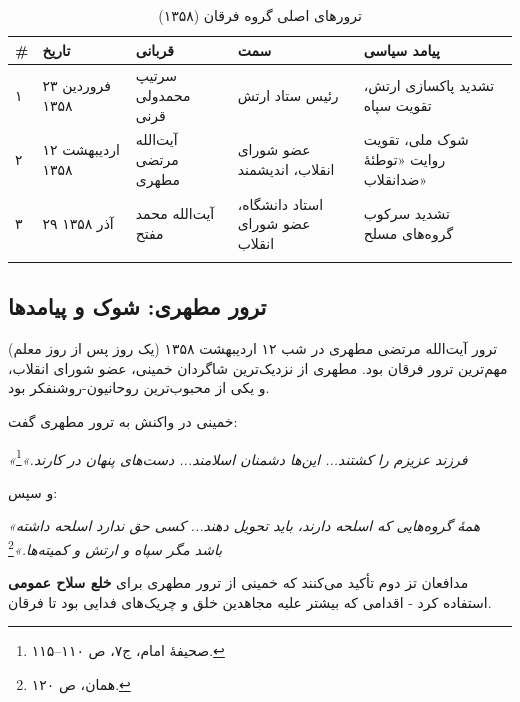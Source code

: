 \documentclass[12pt,a4paper]{book}
\newcommand{\keyword}[1]{\textbf{\textcolor{cPrimary}{#1}}}
\begin{document}
\begin{longtable}{%
    >{\centering\arraybackslash}p{}
    >{\raggedleft\arraybackslash}p{}
    >{\raggedleft\arraybackslash}p{}
    >{\raggedleft\arraybackslash}p{}
    >{\raggedleft\arraybackslash}p{}}
\toprule
\rowcolor{cAccent!10}
\textbf{\#} & \textbf{تاریخ} & \textbf{قربانی} & \textbf{سمت} & \textbf{پیامد سیاسی} \\
\midrule
\endhead

۱ &
۲۳ فروردین ۱۳۵۸ &
سرتیپ محمدولی قرنی &
رئیس ستاد ارتش &
تشدید پاکسازی ارتش، تقویت سپاه \\
\midrule

۲ &
۱۲ اردیبهشت ۱۳۵۸ &
آیت‌الله مرتضی مطهری &
عضو شورای انقلاب، اندیشمند &
شوک ملی، تقویت روایت «توطئهٔ ضدانقلاب» \\
\midrule

۳ &
۲۹ آذر ۱۳۵۸ &
آیت‌الله محمد مفتح &
استاد دانشگاه، عضو شورای انقلاب &
تشدید سرکوب گروه‌های مسلح \\

\bottomrule
\caption{ترورهای اصلی گروه فرقان (۱۳۵۸)}
\label{tab:forqan-assassinations}
\end{longtable}

\subsection{ترور مطهری: شوک و پیامدها}

ترور آیت‌الله مرتضی مطهری در شب ۱۲ اردیبهشت ۱۳۵۸ (یک روز پس از روز معلم) مهم‌ترین ترور فرقان بود. مطهری از نزدیک‌ترین شاگردان خمینی، عضو شورای انقلاب، و یکی از محبوب‌ترین روحانیون-روشنفکر بود.

\begin{warningBox}
خمینی در واکنش به ترور مطهری گفت:

\textit{«فرزند عزیزم را کشتند... این‌ها دشمنان اسلامند... دست‌های پنهان در کارند.»}\footnote{صحیفهٔ امام، ج۷، ص ۱۱۰–۱۱۵.}

و سپس:

\textit{«همهٔ گروه‌هایی که اسلحه دارند، باید تحویل دهند... کسی حق ندارد اسلحه داشته باشد مگر سپاه و ارتش و کمیته‌ها.»}\footnote{همان، ص ۱۲۰.}

مدافعان تز دوم تأکید می‌کنند که خمینی از ترور مطهری برای \keyword{خلع سلاح عمومی} استفاده کرد - اقدامی که بیشتر علیه مجاهدین خلق و چریک‌های فدایی بود تا فرقان.
\end{warningBox}
\end{document}
